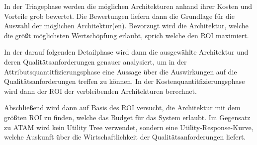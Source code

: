 In der Triagephase werden die möglichen Architekturen anhand ihrer Kosten und Vorteile grob bewertet. Die Bewertungen liefern dann die Grundlage für die Auswahl der möglichen Architektur(en). Bevorzugt wird die Architektur, welche die größt möglichsten Wertschöpfung erlaubt, sprich welche den ROI maximiert. \cite[S. 68]{review}

In der darauf folgenden Detailphase wird dann die ausgewählte Architektur und deren Qualitätsanforderungen genauer analysiert, um in der Attributsquantitfizierungsphase eine Aussage über die Auswirkungen auf die Qualitätsanforderungen treffen zu können. In der Kostenquantitfizierungsphase wird dann der ROI der verbleibenden Architekturen berechnet. \cite[S. 68-69]{review}

Abschließend wird dann auf Basis des ROI versucht, die Architektur mit dem größten ROI zu finden, welche das Budget für das System erlaubt. Im Gegensatz zu ATAM wird kein Utility Tree verwendet, sondern eine \glqq Utility-Response-Kurve\grqq, welche Auskunft über die Wirtschaftlichkeit der Qualitätsanforderungen liefert.  \cite[S. 69]{review}